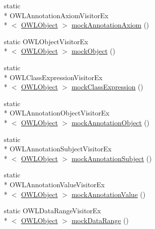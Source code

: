\begin{DoxyCompactItemize}
\item 
static \\*
O\-W\-L\-Annotation\-Axiom\-Visitor\-Ex\\*
$<$ \hyperlink{interfaceorg_1_1semanticweb_1_1owlapi_1_1model_1_1_o_w_l_object}{O\-W\-L\-Object} $>$ \hyperlink{classorg_1_1semanticweb_1_1owlapi_1_1contract_1_1_utils_a6b439bd625b1003004b0976f0b4f6b58}{mock\-Annotation\-Axiom} ()
\item 
static O\-W\-L\-Object\-Visitor\-Ex\\*
$<$ \hyperlink{interfaceorg_1_1semanticweb_1_1owlapi_1_1model_1_1_o_w_l_object}{O\-W\-L\-Object} $>$ \hyperlink{classorg_1_1semanticweb_1_1owlapi_1_1contract_1_1_utils_a819080a5fe511e761aa4557904a57eb7}{mock\-Object} ()
\item 
static \\*
O\-W\-L\-Class\-Expression\-Visitor\-Ex\\*
$<$ \hyperlink{interfaceorg_1_1semanticweb_1_1owlapi_1_1model_1_1_o_w_l_object}{O\-W\-L\-Object} $>$ \hyperlink{classorg_1_1semanticweb_1_1owlapi_1_1contract_1_1_utils_a91ab028dc6c0f48f4ae72102e8a8e966}{mock\-Class\-Expression} ()
\item 
static \\*
O\-W\-L\-Annotation\-Object\-Visitor\-Ex\\*
$<$ \hyperlink{interfaceorg_1_1semanticweb_1_1owlapi_1_1model_1_1_o_w_l_object}{O\-W\-L\-Object} $>$ \hyperlink{classorg_1_1semanticweb_1_1owlapi_1_1contract_1_1_utils_a5e5c2ac2be502fb4ce2cee2dee4527d5}{mock\-Annotation\-Object} ()
\item 
static \\*
O\-W\-L\-Annotation\-Subject\-Visitor\-Ex\\*
$<$ \hyperlink{interfaceorg_1_1semanticweb_1_1owlapi_1_1model_1_1_o_w_l_object}{O\-W\-L\-Object} $>$ \hyperlink{classorg_1_1semanticweb_1_1owlapi_1_1contract_1_1_utils_a357a3887ef6edcd1b3c436e5031b6ace}{mock\-Annotation\-Subject} ()
\item 
static \\*
O\-W\-L\-Annotation\-Value\-Visitor\-Ex\\*
$<$ \hyperlink{interfaceorg_1_1semanticweb_1_1owlapi_1_1model_1_1_o_w_l_object}{O\-W\-L\-Object} $>$ \hyperlink{classorg_1_1semanticweb_1_1owlapi_1_1contract_1_1_utils_a02b2535ff24e2d92984f92967088a808}{mock\-Annotation\-Value} ()
\item 
static O\-W\-L\-Data\-Range\-Visitor\-Ex\\*
$<$ \hyperlink{interfaceorg_1_1semanticweb_1_1owlapi_1_1model_1_1_o_w_l_object}{O\-W\-L\-Object} $>$ \hyperlink{classorg_1_1semanticweb_1_1owlapi_1_1contract_1_1_utils_a3600a08cfd1201afbe065890812eede6}{mock\-Data\-Range} ()

\end{DoxyCompactItemize}
